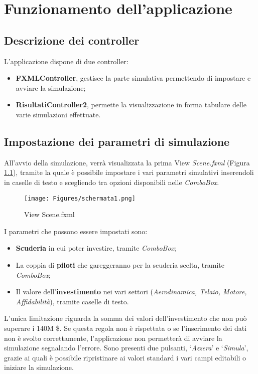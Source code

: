 
\chapter{Funzionamento dell'applicazione}

\section{Descrizione dei controller}
L’applicazione dispone di due controller:
\begin{itemize}
    \item \textbf{FXMLController}, gestisce la parte simulativa permettendo di impostare e avviare la simulazione;
    \item \textbf{RisultatiController2}, permette la visualizzazione in forma tabulare delle varie simulazioni effettuate.
\end{itemize}
\newpage
\section{Impostazione dei parametri di simulazione}
All’avvio della simulazione, verrà visualizzata la prima View \textit{Scene.fxml} (Figura \ref{fig:scene_fxml}), tramite la quale è possibile impostare i vari parametri simulativi inserendoli in caselle di testo e scegliendo tra opzioni disponibili nelle \textit{ComboBox}.

\begin{figure}[h!]
    \centering
    \texttt{[image: Figures/schermata1.png]}
    \caption{View Scene.fxml}
    \label{fig:scene_fxml}
\end{figure}

I parametri che possono essere impostati sono:
\begin{itemize}
    \item \textbf{Scuderia} in cui poter investire, tramite \textit{ComboBox};
    \item La coppia di \textbf{piloti} che gareggeranno per la scuderia scelta, tramite \textit{ComboBox};
    \item Il valore dell’\textbf{investimento} nei vari settori (\textit{Aerodinamica, Telaio, Motore, Affidabilità}), tramite caselle di testo.
\end{itemize}

L’unica limitazione riguarda la somma dei valori dell’investimento che non può superare i 140M \$. Se questa regola non è rispettata o se l’inserimento dei dati non è svolto correttamente, l’applicazione non permetterà di avviare la simulazione segnalando l’errore. Sono presenti due pulsanti, ‘\textit{Azzera}’ e ‘\textit{Simula}’, grazie ai quali è possibile ripristinare ai valori standard i vari campi editabili o iniziare la simulazione.
\newpage
